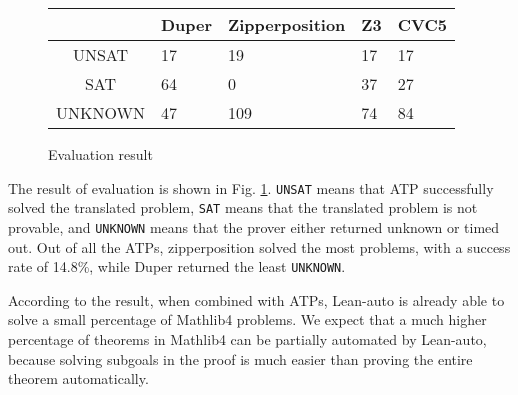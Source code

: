   \begin{figure}
  \begin{center}\begin{tabular}{| c K{6em} K{6em} K{6em} K{6em} |}
    \hline
            & Duper & Zipperposition & Z3 & CVC5 \\ \hline
    UNSAT   & 17    & 19             & 17 & 17   \\
    SAT     & 64    & 0              & 37 & 27   \\
    UNKNOWN & 47    & 109            & 74 & 84   \\ \hline
  \end{tabular}\end{center}
  \caption{Evaluation result} \label{figevalresult}
  \end{figure}

  The result of evaluation is shown in Fig. \ref{figevalresult}. \texttt{UNSAT} means
  that ATP successfully solved the translated problem, \texttt{SAT} means that
  the translated problem is not provable, and \texttt{UNKNOWN} means that the prover
  either returned unknown or timed out. Out of all the ATPs, zipperposition solved the
  most problems, with a success rate of 14.8\%, while Duper returned the least \texttt{UNKNOWN}.
  
  According to the result, when combined with ATPs, Lean-auto is already able to
  solve a small percentage of Mathlib4 problems. We expect that a much higher percentage
  of theorems in Mathlib4 can be partially automated by Lean-auto, because solving
  subgoals in the proof is much easier than proving the entire theorem automatically.